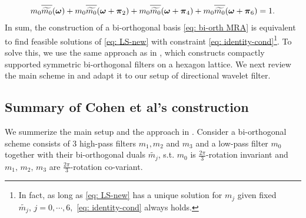 \begin{align}\label{eq: identity-cond}
m_0\sbarm{0} + m_0\sbarmp{0}{2} + m_0\sbarmp{0}{4} + m_0\sbarmp{0}{6} = 1.
\end{align}
In sum, the construction of a bi-orthogonal basis \eqref{eq: bi-orth MRA} is equivalent to find feasible solutions of \eqref{eq: LS-new} with constraint \eqref{eq: identity-cond}\footnote{In fact, as long as \eqref{eq: LS-new} has a unique solution for $m_j$ given fixed $\widetilde{m_j}, \, j = 0,\cdots,6,$ \eqref{eq: identity-cond} always holds. }. To solve this, we use the same approach as in \cite{cohen1993compactly}, which constructs compactly supported symmetric bi-orthogonal filters on a hexagon lattice. We next review the main scheme in \cite{cohen1993compactly} and adapt it to our setup of directional wavelet filter.

\subsection{Summary of Cohen et al's construction}\label{subsec: cohen-summary}
We summerize the main setup and the approach in \cite{cohen1993compactly}. Consider a bi-orthogonal scheme consists of 3 high-pass filters $m_1,m_2$ and $m_3$ and a low-pass filter $m_0$ together with their bi-orthogonal duals $\widetilde{m_j}$, s.t.
$m_0$ is $\frac{2\pi}{3}$-rotation invariant and $m_1,\, m_2,\, m_3$ are $\frac{2\pi}{3}$-rotation co-variant.

